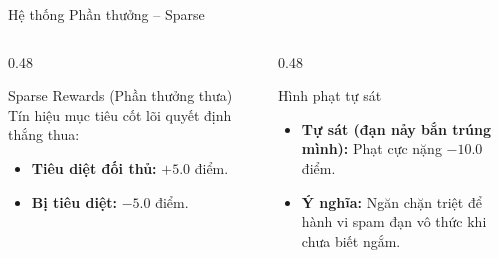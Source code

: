 \documentclass[aspectratio=169]{beamer}
\begin{document}
\begin{frame}{Hệ thống Phần thưởng -- Sparse}
  \begin{columns}[T]
    \begin{column}{0.48\textwidth}
      \begin{block}{Sparse Rewards (Phần thưởng thưa)}
        Tín hiệu mục tiêu cốt lõi quyết định thắng thua:
        \begin{itemize}
          \item \textbf{Tiêu diệt đối thủ:} $+5.0$ điểm.
          \item \textbf{Bị tiêu diệt:} $-5.0$ điểm.
        \end{itemize}
      \end{block}
    \end{column}
    \begin{column}{0.48\textwidth}
      \begin{alertblock}{Hình phạt tự sát}
        \begin{itemize}
          \item \textbf{Tự sát (đạn nảy bắn trúng mình):} Phạt cực nặng $-10.0$ điểm.
          \item \textbf{Ý nghĩa:} Ngăn chặn triệt để hành vi spam đạn vô thức khi chưa biết ngắm.
        \end{itemize}
      \end{alertblock}
    \end{column}
  \end{columns}
\end{frame}
\end{document}
